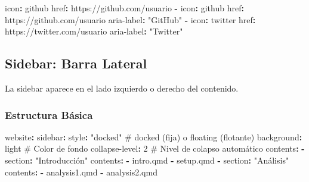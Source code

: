 \documentclass[
  doc,
  floatsintext,
  longtable,
  a4paper,
  nolmodern,
  notxfonts,
  notimes,
  12pt,
  colorlinks=true,linkcolor=blue,citecolor=blue,urlcolor=blue]{apa7}
\newenvironment{Shaded}{\begin{snugshade}}{\end{snugshade}}
\newcommand{\AttributeTok}[1]{\textcolor[rgb]{0.40,0.45,0.13}{#1}}
\newcommand{\CommentTok}[1]{\textcolor[rgb]{0.37,0.37,0.37}{#1}}
\newcommand{\DecValTok}[1]{\textcolor[rgb]{0.68,0.00,0.00}{#1}}
\newcommand{\FunctionTok}[1]{\textcolor[rgb]{0.28,0.35,0.67}{#1}}
\newcommand{\KeywordTok}[1]{\textcolor[rgb]{0.00,0.23,0.31}{\textbf{#1}}}
\newcommand{\StringTok}[1]{\textcolor[rgb]{0.13,0.47,0.30}{#1}}
\begin{document}
\begin{Shaded}
\begin{Highlighting}[]
\AttributeTok{            }\FunctionTok{icon}\KeywordTok{:}\AttributeTok{ github}
\AttributeTok{            }\FunctionTok{href}\KeywordTok{:}\AttributeTok{ https://github.com/usuario}
\AttributeTok{      }\KeywordTok{{-}}\AttributeTok{ }\FunctionTok{icon}\KeywordTok{:}\AttributeTok{ github}
\AttributeTok{        }\FunctionTok{href}\KeywordTok{:}\AttributeTok{ https://github.com/usuario}
\AttributeTok{        }\FunctionTok{aria{-}label}\KeywordTok{:}\AttributeTok{ }\StringTok{"GitHub"}
\AttributeTok{      }\KeywordTok{{-}}\AttributeTok{ }\FunctionTok{icon}\KeywordTok{:}\AttributeTok{ twitter}
\AttributeTok{        }\FunctionTok{href}\KeywordTok{:}\AttributeTok{ https://twitter.com/usuario}
\AttributeTok{        }\FunctionTok{aria{-}label}\KeywordTok{:}\AttributeTok{ }\StringTok{"Twitter"}
\end{Highlighting}
\end{Shaded}

\subsection{Sidebar: Barra Lateral}\label{sidebar-barra-lateral}

La sidebar aparece en el lado izquierdo o derecho del contenido.

\subsubsection{Estructura Básica}\label{estructura-buxe1sica-1}

\begin{Shaded}
\begin{Highlighting}[]
\FunctionTok{website}\KeywordTok{:}
\AttributeTok{  }\FunctionTok{sidebar}\KeywordTok{:}
\AttributeTok{    }\FunctionTok{style}\KeywordTok{:}\AttributeTok{ }\StringTok{"docked"}\CommentTok{                  \# docked (fija) o floating (flotante)}
\AttributeTok{    }\FunctionTok{background}\KeywordTok{:}\AttributeTok{ light}\CommentTok{                \# Color de fondo}
\AttributeTok{    }\FunctionTok{collapse{-}level}\KeywordTok{:}\AttributeTok{ }\DecValTok{2}\CommentTok{                \# Nivel de colapso automático}
\AttributeTok{    }\FunctionTok{contents}\KeywordTok{:}
\AttributeTok{      }\KeywordTok{{-}}\AttributeTok{ }\FunctionTok{section}\KeywordTok{:}\AttributeTok{ }\StringTok{"Introducción"}
\AttributeTok{        }\FunctionTok{contents}\KeywordTok{:}
\AttributeTok{          }\KeywordTok{{-}}\AttributeTok{ intro.qmd}
\AttributeTok{          }\KeywordTok{{-}}\AttributeTok{ setup.qmd}
\AttributeTok{      }\KeywordTok{{-}}\AttributeTok{ }\FunctionTok{section}\KeywordTok{:}\AttributeTok{ }\StringTok{"Análisis"}
\AttributeTok{        }\FunctionTok{contents}\KeywordTok{:}
\AttributeTok{          }\KeywordTok{{-}}\AttributeTok{ analysis1.qmd}
\AttributeTok{          }\KeywordTok{{-}}\AttributeTok{ analysis2.qmd}
\end{Highlighting}
\end{Shaded}
\end{document}
